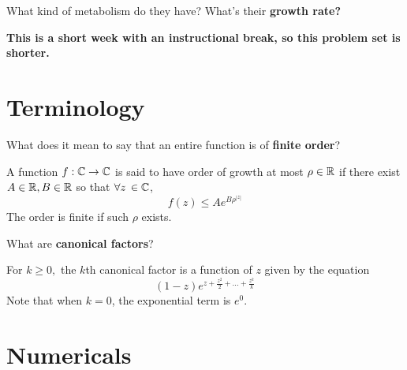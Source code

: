\documentclass{homework}
\author{Alex Li}
\begin{document}
\maketitle

\begin{inspiration}
What kind of metabolism do they have? What's their \textbf{growth rate?}
\end{inspiration}

\textbf{This is a short week with an instructional break, so this
  problem set is shorter.}

  \section{Terminology}

  \begin{problem}
    What does it mean to say that an entire function is of
      \textbf{finite order}?
      \end{problem}
      \begin{solution}
      A function $f:\mathbb{C}\to\mathbb{C}$ is said to have order of growth at most $\rho\in\mathbb{R}$ if there exist $A\in\mathbb{R}, B\in\mathbb{R}$ so that $\forall z\, \in \mathbb{C}$,
      \[
      f(z) \leq Ae^{B\rho^{|z|}}
      \]
      The order is finite if such $\rho$ exists.
      \end{solution}
      \begin{problem}
        What are \textbf{canonical factors}?
        \end{problem}
        \begin{solution}
        For $k\geq0,$ the $k$th canonical factor is a function of $z$ given by the equation
        \[
        \left(1-z\right)e^{z + \frac{z^2}{2} + \dots + \frac{z^k}{k}}
        \]
        Note that when $k=0$, the exponential term is $e^0$.
        \end{solution}
        \section{Numericals}
\end{document}
